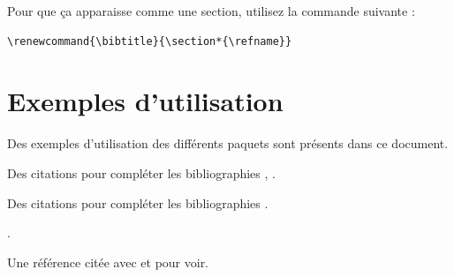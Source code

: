 Pour que ça apparaisse comme une section, utilisez la commande suivante :

\begin{framed}\vspace{-0.75em}
  \begin{verbatim}\renewcommand{\bibtitle}{\section*{\refname}}
\end{verbatim}\vspace{-0.75em}
\end{framed}


\section{Exemples d'utilisation}

Des exemples d'utilisation des différents paquets sont présents dans ce document.


Des citations pour compléter les bibliographies , .


Des citations pour compléter les bibliographies \cite{HHSD2011}.

.

Une référence citée avec   et  \cite{DHHS2011} pour voir.

\printbibliography[category=mine, heading=minestyle]
